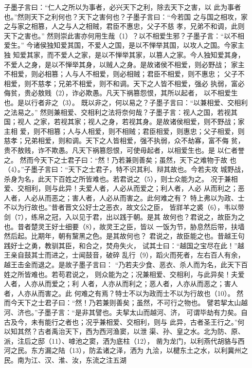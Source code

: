 \documentclass[12pt,UTF8]{ctexbook}
\begin{document}
 子墨子言曰：“仁人之所以为事者，必兴天下之利，除去天下之害，以 
此为事者也。”然则天下之利何也？天下之害何也？子墨子言曰：“今若国 
之与国之相攻，家之与家之相篡，人之与人之相贼，君臣不惠忠，父子不慈 
孝，兄弟不和调，此则天下之害也。” 
然则崇此害亦何用生哉（1）？以不相爱生邪？子墨子言：“以不相爱生。” 
今诸侯独知爱其国，不爱人之国，是以不惮举其国，以攻人之国。今家主独 
知爱其家，而不爱人之家，是以不惮举其家，以篡人之家。今人独知爱其身， 
不爱人之身，是以不惮举其身，以贼人之身。是故诸侯不相爱，则必野战； 
家主不相爱，则必相篡；人与人不相爱，则必相贼；君臣不相爱，则不惠忠； 
父子不相爱，则不慈孝；兄弟不相爱，则不和调。天下之人皆不相爱，强必 
执弱，富必侮贫，贵必敖贱（2），诈必欺愚。凡天下祸篡怨恨，其所以起者， 
以不相爱生也。是以行者非之（3）。 
既以非之，何以易之？子墨子言曰：“以兼相爱、交相利之法易之。” 
然则兼相爱、交相利之法将奈何哉？子墨子言：视人之国，若视其国；视人 
之家，若视其家；视人之身，若视其身。是故诸侯相爱，则不野战；家主相 
爱，则不相篡；人与人相爱，则不相贼；君臣相爱，则惠忠；父子相爱，则 
慈孝；兄弟相爱，则和调。天下之人皆相爱，强不执弱，众不劫寡，富不侮 
贫，贵不敖贱，诈不欺愚。凡天下祸篡怨恨，可使毋起者，以相爱生也。是 
以仁者誉之。 
然而今天下之士君子曰：“然！乃若兼则善矣；虽然，天下之难物于故 
也（4）。”子墨子言曰：“天下之士君子，特不识其利、辩其故也。今若夫攻 
城野战，杀身为名，此天下百姓之所皆难也。若君说之（5），则士众能为之。 
况于兼相爱、交相利，则与此异！夫爱人者，人必从而爱之；利人者，人必 
从而利之；恶人者，人必从而恶之；害人者，人必从而害之。此何难之有？ 
特上弗以为政、士不以为行故也。”昔者晋文公好士之恶衣，故文公之臣， 
皆牂羊之裘（6），韦以带剑（7），练帛之冠，入以见于君，出以践于朝。是其 
故何也？君说之，故臣为之也。昔者楚灵王好士细要（8），故灵王之臣，皆以 
一饭为节，胁息然后带，扶墙然后起。比期年，朝有黧黑之色。是其故何也？ 
君说之，故臣能之也。昔越王句践好士之勇，教驯其臣，和合之，焚舟失火， 
试其士曰：“越国之宝尽在此！”越王亲自鼓其士而进之，士闻鼓音，破碎 
乱行（9），蹈火而死者，左右百人有余，越王击金而退之。是故子墨子言曰： 
“乃若夫少食、恶衣、杀人而为名，此天下百姓之所皆难也。若苟君说之， 
则众能为之；况兼相爱、交相利，与此异矣！夫爱人者，人亦从而爱之；利 
人者，人亦从而利之；恶人者，人亦从而恶之；害人者，人亦从而害之。此 
何难之有焉？特士不以为政而士不以为行故也（10）。 
然而今天下之士君子曰：“然！乃若兼则善矣；虽然，不可行之物也。 
譬若挈太山越河、济也。”子墨子言：“是非其譬也。夫挈太山而越河、济， 
可谓毕劫有力矣。自古及今，未有能行之者也；况乎兼相爱、交相利，则与 
此异，古者圣王行之。”何以知其然？古者禹治天下，西为西河渔窦，以泄 
渠、孙、皇之水。北为防、原、派，注后之邸（11）、嘑池之窦，洒为底柱（12）， 
凿为龙门，以利燕代胡貉与西河之民。东方漏之陆（13），防孟诸之泽，洒为 
九浍，以楗东土之水，以利冀州之民。南为江、汉、淮、汝，东流之注五湖 
\end{document}
